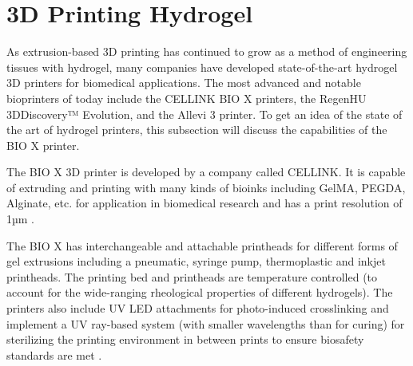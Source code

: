 \section{3D Printing Hydrogel}
As extrusion-based 3D printing has continued to grow as a method of engineering tissues with hydrogel, many companies have developed state-of-the-art hydrogel 3D printers for biomedical applications. The most advanced and notable bioprinters of today include the CELLINK BIO X printers, the RegenHU 3DDiscovery™ Evolution, and the Allevi 3 printer. To get an idea of the state of the art of hydrogel printers, this subsection will discuss the capabilities of the BIO X printer.

The BIO X 3D printer is developed by a company called CELLINK. It is capable of extruding and printing with many kinds of bioinks including GelMA, PEGDA, Alginate, etc. for application in biomedical research and has a print resolution of 1µm \citep{biox_brochure}. 

The BIO X has interchangeable and attachable printheads for different forms of gel extrusions including a pneumatic, syringe pump, thermoplastic and inkjet printheads. The printing bed and printheads are temperature controlled (to account for the wide-ranging rheological properties of different hydrogels). The printers also include UV LED attachments for photo-induced crosslinking and implement a UV ray-based system (with smaller wavelengths than for curing) for sterilizing the printing environment in between prints to ensure biosafety standards are met \citep{biox_brochure}.
